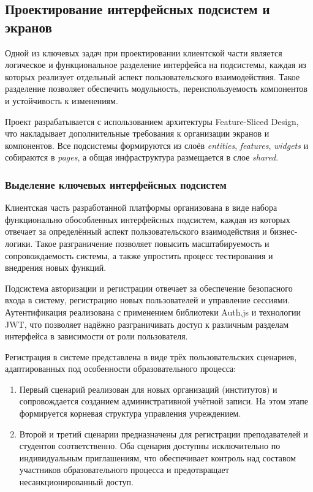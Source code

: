 \subsection{Проектирование интерфейсных подсистем и экранов}

Одной из ключевых задач при проектировании клиентской части является логическое и функциональное разделение интерфейса на подсистемы, каждая из которых реализует отдельный аспект пользовательского взаимодействия. Такое разделение позволяет обеспечить модульность, переиспользуемость компонентов и устойчивость к изменениям.

Проект разрабатывается с использованием архитектуры Feature-Sliced Design, что накладывает дополнительные требования к организации экранов и компонентов. Все подсистемы формируются из слоёв \textit{entities}, \textit{features}, \textit{widgets} и собираются в \textit{pages}, а общая инфраструктура размещается в слое \textit{shared}.

\subsubsection{Выделение ключевых интерфейсных подсистем}

Клиентская часть разработанной платформы организована в виде набора функционально обособленных интерфейсных подсистем, каждая из которых отвечает за определённый аспект пользовательского взаимодействия и бизнес-логики. Такое разграничение позволяет повысить масштабируемость и сопровождаемость системы, а также упростить процесс тестирования и внедрения новых функций.

Подсистема авторизации и регистрации отвечает за обеспечение безопасного входа в систему, регистрацию новых пользователей и управление сессиями. Аутентификация реализована с применением библиотеки Auth.js и технологии JWT, что позволяет надёжно разграничивать доступ к различным разделам интерфейса в зависимости от роли пользователя.

Регистрация в системе представлена в виде трёх пользовательских сценариев, адаптированных под особенности образовательного процесса:
\begin{enumerate}
\item Первый сценарий реализован для новых организаций (институтов) и сопровождается созданием административной учётной записи. На этом этапе формируется корневая структура управления учреждением.
\item Второй и третий сценарии предназначены для регистрации преподавателей и студентов соответственно. Оба сценария доступны исключительно по индивидуальным приглашениям, что обеспечивает контроль над составом участников образовательного процесса и предотвращает несанкционированный доступ.
\end{enumerate}

